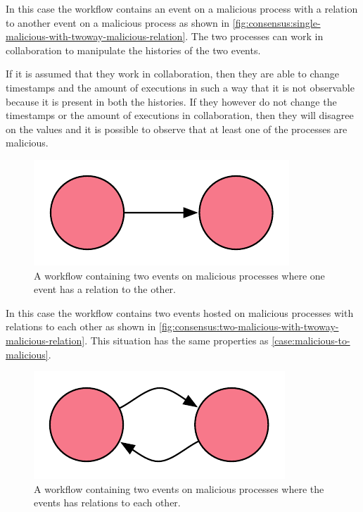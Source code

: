	\begin{case}
		In this case the workflow contains an event on a malicious process with a relation to another event on a malicious process as shown in \autoref{fig:consensus:single-malicious-with-twoway-malicious-relation}. The two processes can work in collaboration to manipulate the histories of the two events. 
		
		If it is assumed that they work in collaboration, then they are able to change timestamps and the amount of executions in such a way that it is not observable because it is present in both the histories. If they however do not change the timestamps or the amount of executions in collaboration, then they will disagree on the values and it is possible to observe that at least one of the processes are malicious.
		\label{case:malicious-to-malicious}
	\end{case}
	
	\begin{figure}[H]
		\centering
		\includegraphics[]{5validation/images/4.pdf}
		\caption{A workflow containing two events on malicious processes where one event has a relation to the other.}
		\label{fig:consensus:single-malicious-with-twoway-malicious-relation}
	\end{figure}
	
	\begin{case}
		In this case the workflow contains two events hosted on malicious processes with relations to each other as shown in \autoref{fig:consensus:two-malicious-with-twoway-malicious-relation}. This situation has the same properties as \autoref{case:malicious-to-malicious}.
		\label{case:malicious-to-from-malicious}
	\end{case}

	\begin{figure}[H]
		\centering
		\includegraphics[]{5validation/images/7.pdf}
		\caption{A workflow containing two events on malicious processes where the events has relations to each other.}
		\label{fig:consensus:two-malicious-with-twoway-malicious-relation}
	\end{figure}
	
